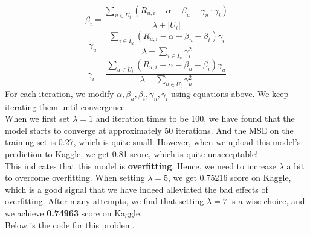 \documentclass[a4paper]{article}
\begin{document}
\begin{equation}
\beta_i = \frac{\sum_{u \in U_i}(R_{u,i}-\alpha-\beta_u-\gamma_u \cdot \gamma_i)}{\lambda + \left| U_i \right|}
\end{equation}
\begin{equation}
\gamma_u = \frac{\sum_{i \in I_u}(R_{u,i}-\alpha - \beta_u-\beta_i)\gamma_i}{\lambda+\sum_{i \in I_u}\gamma_i^2}
\end{equation}
\begin{equation}
\gamma_i = \frac{\sum_{u \in U_i}(R_{u,i}-\alpha - \beta_u-\beta_i)\gamma_u}{\lambda+\sum_{u \in U_i}\gamma_u^2}
\end{equation}
For each iteration, we modify $\alpha, \beta_u, \beta_i, \gamma_u, \gamma_i$ using equations above. We keep iterating them until convergence.\\
When we first set $\lambda = 1$ and iteration times to be 100, we have found that the model starts to converge at approximately 50 iterations. And the MSE on the training set is 0.27, which is quite small. However, when we upload this model's prediction to Kaggle, we get 0.81 score, which is quite unacceptable!\\
This indicates that this model is \textbf{overfitting}. Hence, we need to increase $\lambda$ a bit to overcome overfitting. When setting $\lambda = 5$, we get 0.75216 score on Kaggle, which is a good signal that we have indeed alleviated the bad effects of overfitting. After many attempts, we find that setting $\lambda = 7$ is a wise choice, and we achieve \textbf{0.74963} score on Kaggle.\\
Below is the code for this problem.
\end{document}
